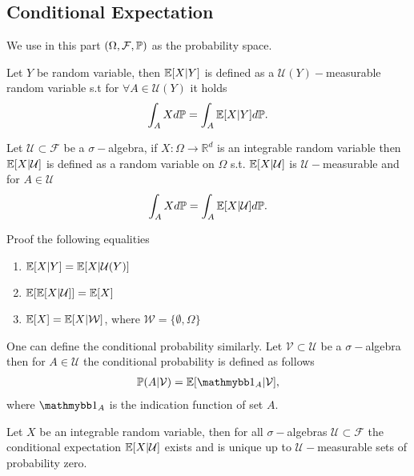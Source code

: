 \subsection{Conditional Expectation}
We use in this part $(\Omega ,\mathcal{F},\P)$  as the probability space.
\begin{definition}
  Let $Y$ be random variable, then $\E[X|  Y] $ is defined as a $\mathcal{U}(Y)-$measurable random variable
  s.t for $\forall  A \in \mathcal{U}(Y)$ it holds 
  \begin{align*}
    \int_A X d\P = \int_A \E[X|Y] d\P
  .\end{align*}
\end{definition}
\begin{definition}
 Let  $\mathcal{ U} \subset  \mathcal{F}$ be a $\sigma-$algebra,
 if $X  : \Omega  \to  \mathbb{R}^{d} $ is an integrable random variable then $\E[X |\mathcal{U}]$  is
 defined as a random variable on $\Omega$ s.t. $\E[X | \mathcal{U}]$ is $\mathcal{U}-$measurable and for $A \in  \mathcal{U}$
 \begin{align*}
   \int_A X d\P  = \int_A \E[X | \mathcal{U}] d \P
 .\end{align*}
\end{definition}
\begin{exercise}
 Proof the following equalities  
 \begin{enumerate}
   \item $\E[X|Y] = \E[X | \mathcal{U}(Y)]$
   \item $\E[\E[X|\mathcal{U}]] = \E[X]$
   \item $\E[X] = \E[X | \mathcal{W}]$, where $\mathcal{W} = \{\emptyset,\Omega \}  $
 \end{enumerate}
\end{exercise}
\begin{remark}
 One can define the conditional probability similarly. Let $\mathcal{V} \subset  \mathcal{U}$  be a $\sigma-$algebra 
 then for $A \in  \mathcal{U}$ the conditional probability is defined as follows
 \begin{align*}
   \P(A | \mathcal{V}) = \E[\cha_A | \mathcal{V}]
 ,\end{align*}
where $\cha_A$ is the indication function of set $A$.
\end{remark}
\begin{theorem}
 Let $X$ be an integrable random variable, then for all $\sigma-$algebras $\mathcal{U} \subset  \mathcal{F}$  the 
 conditional expectation $\E[X | \mathcal{U}]$ exists and is unique up to $\mathcal{U}-$measurable sets of probability
 zero.
\end{theorem}
